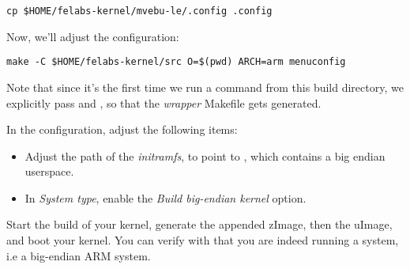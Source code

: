 \begin{verbatim}
cp $HOME/felabs-kernel/mvebu-le/.config .config
\end{verbatim}

Now, we'll adjust the configuration:

\begin{verbatim}
make -C $HOME/felabs-kernel/src O=$(pwd) ARCH=arm menuconfig
\end{verbatim}

Note that since it's the first time we run a  command from
this build directory, we explicitly pass  and , so
that the {\em wrapper} Makefile gets generated.

In the configuration, adjust the following items:

\begin{itemize}
\item Adjust the path of the {\em initramfs}, to point to
  , which
  contains a big endian userspace.
\item In {\em System type}, enable the {\em Build big-endian kernel}
  option.
\end{itemize}

Start the build of your kernel, generate the appended zImage, then the
uImage, and boot your kernel. You can verify with  that
you are indeed running a  system, i.e a big-endian ARM
system.
